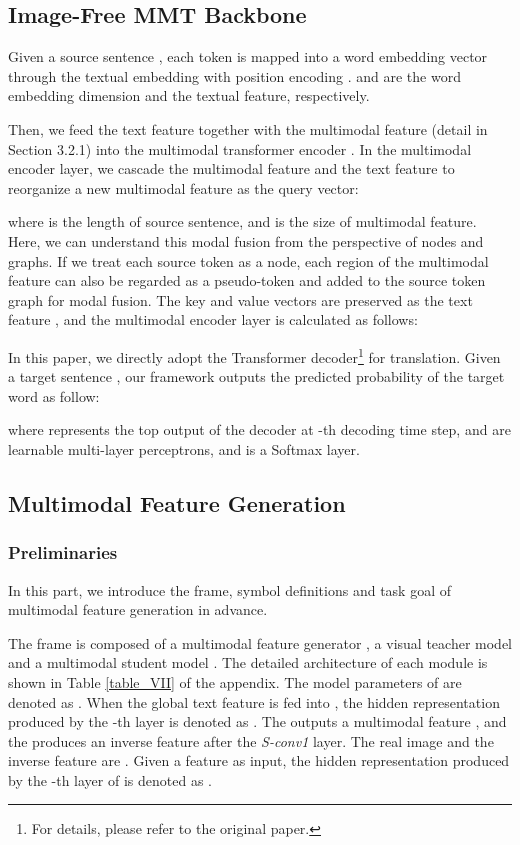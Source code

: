 \documentclass[11pt]{article}
\begin{document}
\subsection{Image-Free MMT Backbone}
Given a source sentence , each token  is mapped into a word embedding vector  through the textual embedding with position encoding \cite{ gehring-2017-convolutional}.
 and  are the word embedding dimension and the textual feature, respectively.

Then, we feed the text feature  together with the multimodal feature  (detail in Section 3.2.1) into the multimodal transformer encoder \cite{yao-wan-2020-multimodal}.
In the multimodal encoder layer, we cascade the multimodal feature  and the text feature  to reorganize a new multimodal feature  as the query vector:


where  is the length of source sentence, and  is the size of multimodal feature. Here, we can understand this modal fusion from the perspective of nodes and graphs.
If we treat each source token as a node, each region of the multimodal feature can also be regarded as a pseudo-token and added to the source token graph for modal fusion.
The key and value vectors are preserved as the text feature , and the multimodal encoder layer is calculated as follows:


In this paper, we directly adopt the Transformer decoder\footnote{For details, please refer to the original paper.} \cite{vaswani2017attention} for translation.
Given a target sentence , our framework outputs the predicted probability of the target word  as follow:

where  represents the top output of the decoder at -th decoding time step,  and  are learnable multi-layer perceptrons, and  is a Softmax layer.


\subsection{Multimodal Feature Generation}
\subsubsection{Preliminaries}
In this part, we introduce the frame, symbol definitions and task goal of multimodal feature generation in advance.

The frame is composed of a multimodal feature generator , a visual teacher model  and a multimodal student model .
The detailed architecture of each module is shown in Table \ref{table_VII} of the appendix.
The model parameters of  are denoted as .
When the global text feature  is fed into , the hidden representation produced by the -th layer is denoted as .
The  outputs a multimodal feature , and the  produces an inverse feature  after the \textit{S-conv1} layer.
The real image and the inverse feature are .
Given a feature  as input, the hidden representation produced by the -th layer of  is denoted as .
\end{document}
